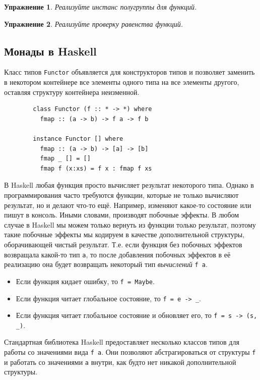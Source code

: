 \documentclass[12pt]{article}
\newcommand{\point}[1]{{\color{blue}\textit{#1}}} %
\newtheorem{task}{Упражнение}
\begin{document}
    \begin{task}
        Реализуйте инстанс полугруппы для функций.
    \end{task}

    \begin{task}
        Реализуйте проверку равенства функций.
    \end{task}

    \subsection{Монады в Haskell}

    Класс типов \texttt{Functor} объявляется для конструкторов типов и позволяет заменить в некотором контейнере все элементы одного типа на все элементы другого, оставляя структуру контейнера неизменной.

    \begin{verbatim}
        class Functor (f :: * -> *) where
          fmap :: (a -> b) -> f a -> f b

        instance Functor [] where
          fmap :: (a -> b) -> [a] -> [b]
          fmap _ [] = []
          fmap f (x:xs) = f x : fmap f xs
    \end{verbatim}

    В Haskell любая функция просто вычисляет результат некоторого типа.
    Однако в программирования часто требуются функции, которые не только вычисляют результат, но и делают что-то ещё.
    Например, изменяют какое-то состояние или пишут в консоль.
    Иными словами, производят побочные эффекты.
    В любом случае в Haskell мы можем только вернуть из функции только результат, поэтому такие побочные эффекты мы кодируем в качестве дополнительной структуры, оборачивающей чистый результат.
    Т.е. если функция без побочных эффектов возвращала какой-то тип \texttt{a}, то после добавления побочных эффектов в её реализацию она будет возвращать некоторый тип \point{вычислений} \texttt{f a}.

    \begin{itemize}
        \item Если функция кидает ошибку, то \texttt{f = Maybe}.
        \item Если функция читает глобальное состояние, то \texttt{f = e -> \_}.
        \item Если функция читает глобальное состояние и обновляет его, то \texttt{f = s -> (s, \_)}.
    \end{itemize}

    Стандартная библиотека Haskell предоставляет несколько классов типов для работы со значениями вида \texttt{f a}.
    Они позволяют абстрагироваться от структуры \texttt{f} и работать со значениями \texttt{a} внутри, как будто нет никакой дополнительной структуры.
\end{document}
